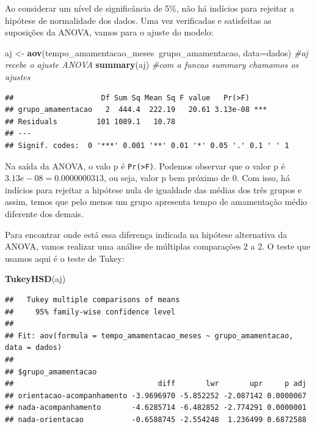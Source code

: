 \documentclass[
]{book}
\newenvironment{Shaded}{\begin{snugshade}}{\end{snugshade}}
\newcommand{\CommentTok}[1]{\textcolor[rgb]{0.56,0.35,0.01}{\textit{#1}}}
\newcommand{\DataTypeTok}[1]{\textcolor[rgb]{0.13,0.29,0.53}{#1}}
\newcommand{\KeywordTok}[1]{\textcolor[rgb]{0.13,0.29,0.53}{\textbf{#1}}}
\newcommand{\NormalTok}[1]{#1}
\newcommand{\OperatorTok}[1]{\textcolor[rgb]{0.81,0.36,0.00}{\textbf{#1}}}
\newcommand{\StringTok}[1]{\textcolor[rgb]{0.31,0.60,0.02}{#1}}
\begin{document}
Ao considerar um nível de significância de 5\%, não há indícios para rejeitar a hipótese de normalidade dos dados. Uma vez verificadas e satisfeitas as suposições da ANOVA, vamos para o ajuste do modelo:

\begin{Shaded}
\begin{Highlighting}[]
\NormalTok{aj <-}\StringTok{ }\KeywordTok{aov}\NormalTok{(tempo_amamentacao_meses}\OperatorTok{~}\NormalTok{grupo_amamentacao,}
          \DataTypeTok{data=}\NormalTok{dados)  }\CommentTok{#aj recebe o ajuste ANOVA}
\KeywordTok{summary}\NormalTok{(aj) }\CommentTok{#com a funcao summary chamamos os ajustes}
\end{Highlighting}
\end{Shaded}

\begin{verbatim}
##                    Df Sum Sq Mean Sq F value   Pr(>F)    
## grupo_amamentacao   2  444.4  222.19   20.61 3.13e-08 ***
## Residuals         101 1089.1   10.78                     
## ---
## Signif. codes:  0 '***' 0.001 '**' 0.01 '*' 0.05 '.' 0.1 ' ' 1
\end{verbatim}

Na saída da ANOVA, o valo p é \texttt{Pr(\textgreater{}F)}. Podemos observar que o valor p é \(3.13e-08=0.0000000313\), ou seja, valor p bem próximo de 0. Com isso, há indícios para rejeitar a hipótese nula de igualdade das médias dos três grupos e assim, temos que pelo menos um grupo apresenta tempo de amamentação médio diferente dos demais.

Para encontrar onde está essa diferença indicada na hipótese alternativa da ANOVA, vamos realizar uma análise de múltiplas comparações 2 a 2. O teste que usamos aqui é o teste de Tukey:

\begin{Shaded}
\begin{Highlighting}[]
\KeywordTok{TukeyHSD}\NormalTok{(aj)}
\end{Highlighting}
\end{Shaded}

\begin{verbatim}
##   Tukey multiple comparisons of means
##     95% family-wise confidence level
## 
## Fit: aov(formula = tempo_amamentacao_meses ~ grupo_amamentacao, data = dados)
## 
## $grupo_amamentacao
##                                 diff       lwr       upr     p adj
## orientacao-acompanhamento -3.9696970 -5.852252 -2.087142 0.0000067
## nada-acompanhamento       -4.6285714 -6.482852 -2.774291 0.0000001
## nada-orientacao           -0.6588745 -2.554248  1.236499 0.6872588
\end{verbatim}
\end{document}
